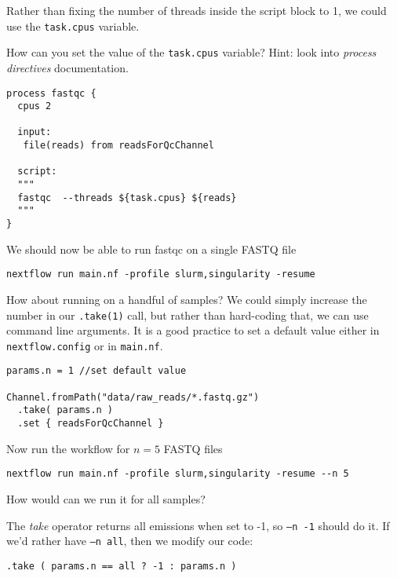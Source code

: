 \begin{bonus}
Rather than fixing the number of threads inside the script block to 1, we could use the \texttt{task.cpus} variable. 

\begin{questions}
How can you set the value of the \texttt{task.cpus} variable? Hint: look into \emph{process directives} documentation.
\begin{answer}
\begin{lstlisting}
process fastqc {
  cpus 2
    
  input:
   file(reads) from readsForQcChannel

  script:
  """
  fastqc  --threads ${task.cpus} ${reads}
  """
}
\end{lstlisting}
\end{answer}
\end{questions}
\end{bonus}


We should now be able to run fastqc on a single FASTQ file

\begin{steps}
\begin{lstlisting}
nextflow run main.nf -profile slurm,singularity -resume
\end{lstlisting}
\end{steps}

How about running on a handful of samples? We could simply increase the number in our \texttt{.take(1)} call, but rather than hard-coding that, we can use command line arguments. It is a good practice to set a default value either in \texttt{nextflow.config} or in \texttt{main.nf}.

\begin{lstlisting}
params.n = 1 //set default value

Channel.fromPath("data/raw_reads/*.fastq.gz")
  .take( params.n )
  .set { readsForQcChannel }
\end{lstlisting}

Now run the workflow for $n = 5$ FASTQ files

\begin{steps}
\begin{lstlisting}
nextflow run main.nf -profile slurm,singularity -resume --n 5
\end{lstlisting}
\end{steps}

\begin{bonus}
\begin{questions}
How would can we run it for all samples?
\begin{answer}
The \emph{take} operator returns all emissions when set to -1, 
so \texttt{--n -1} should do it. If we'd rather have \texttt{--n all},
then we modify our code: 
\begin{lstlisting}
.take ( params.n == all ? -1 : params.n ) 
\end{lstlisting}
\end{answer}
\end{questions}
\end{bonus}

